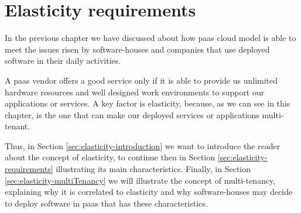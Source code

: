 %
%
\chapter{Elasticity requirements}
\label{cap:elasticity}
In the previous chapter we have discussed about how \ac{paas} cloud model is able to meet the issues risen
by software-houses and companies that use deployed software in their daily activities.

A \ac{paas} vendor offers a good service only if it is able to provide us unlimited hardware resources and
well designed work environments to support our applications or services. A key factor is elasticity, because,
as we can see in this chapter, is the one that can make our deployed services or applications multi-tenant.

Thus, in Section \ref{sec:elasticity-introduction} we want to introduce the reader about the concept of
elasticity, to continue then in Section \ref{sec:elasticity-requirements} illustrating its main
characteristics. Finally, in Section \ref{sec:elasticity-multiTenancy} we will illustrate the concept of
multi-tenancy, explaining why it is correlated to elasticity and why software-houses may
decide to deploy software in \ac{paas} that has these characteristics.







